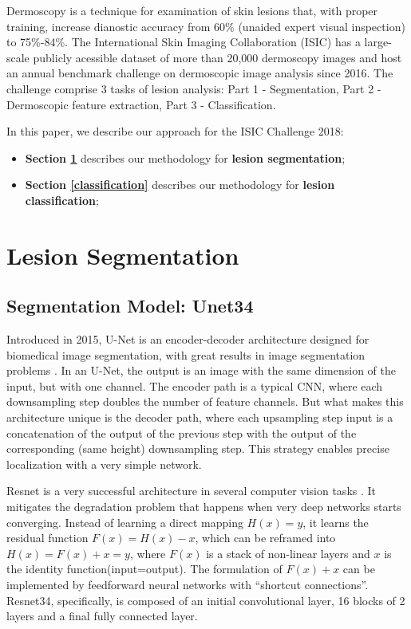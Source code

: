 \documentclass[conference]{IEEEtran}
\begin{document}
Dermoscopy is a technique for examination of skin lesions that, with proper training, increase dianostic accuracy from 60\% (unaided expert visual inspection) to 75\%-84\%\cite{isic}. The International Skin Imaging Collaboration (ISIC) has a large-scale publicly acessible dataset of more than 20,000 dermoscopy images and host an annual benchmark challenge on dermoscopic image analysis since 2016.  The challenge comprise 3 tasks of lesion analysis: Part 1 - Segmentation, Part 2 - Dermoscopic feature extraction, Part 3 - Classification. 

In this paper, we describe our approach for the ISIC Challenge 2018:
\begin{itemize}
\item \textbf{Section \ref{segmentation}} describes our methodology for \textbf{lesion segmentation};
\item \textbf{Section \ref{classification}} describes our methodology for \textbf{lesion classification};
\end{itemize}


\section{Lesion Segmentation}
\label{segmentation}


\subsection{Segmentation Model: Unet34}
Introduced in 2015, U-Net is an encoder-decoder architecture designed for biomedical image segmentation\cite{olaf}, with great results in image segmentation problems \cite{iglovikov}. In an U-Net, the output is an image with the same dimension of the input, but with one channel.  The encoder path is a typical CNN, where each downsampling step doubles the number of feature channels. But what makes this architecture unique is the decoder path, where each upsampling step input is a concatenation of the output of the previous step with the output of the corresponding (same height) downsampling step. This strategy enables precise localization with a very simple network. 

Resnet is a very successful architecture in several computer vision tasks \cite{he}. It mitigates the degradation problem that happens when very deep networks starts converging. Instead of learning a direct mapping $H(x) = y$, it learns the residual function  $F(x) = H(x)-x$, which can be reframed into $H(x) = F(x)+x = y$, where $F(x)$ is a stack of non-linear layers and $x$ is the identity function(input=output). The formulation of $F(x)+x$ can be implemented by feedforward neural networks with “shortcut connections”. Resnet34, specifically, is composed of an initial convolutional layer, 16 blocks of 2 layers and a final fully connected layer.
\end{document}
